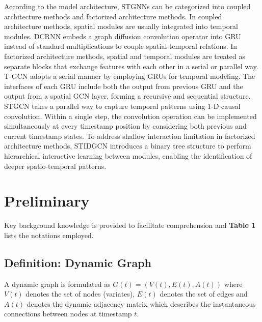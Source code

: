\documentclass[final,12pt]{elsarticle}
\begin{document}
According to the model architecture, 
STGNNs can be categorized into 
coupled architecture methods and factorized architecture methods.  %
In coupled architecture methods, 
spatial modules are usually integrated into temporal modules.  %
DCRNN \cite{li2017diffusion} 
embeds a graph diffusion convolution operator 
into GRU instead of standard multiplications 
to couple spatial-temporal relations.  %
In factorized architecture methods, 
spatial and temporal modules are treated as separate blocks 
that exchange features with each other in a serial or parallel way.  %
T-GCN \cite{zhao2019t} adopts a serial manner by employing GRUs for temporal modeling.
The interfaces of each GRU include 
both the output from previous GRU 
and the output from a spatial GCN layer, 
forming a recursive and sequential structure.  %
STGCN \cite{yu2017spatio} takes a parallel way to capture temporal patterns 
using 1-D causal convolution.
Within a single step, the convolution operation can be implemented 
simultaneously at every timestamp position 
by considering both previous and current timestamp states.  %
To address shallow interaction limitation in factorized architecture methods, 
STIDGCN \cite{liu2024spatial} introduces a binary tree structure 
to perform hierarchical interactive learning between modules, 
enabling the identification of deeper spatio-temporal patterns.  %


\section{Preliminary}
\label{sec-3}


Key background knowledge is provided to facilitate comprehension 
and \textbf{Table 1} lists the notations employed.  %


\subsection{Definition: Dynamic Graph}
\label{subsec-3.1}


A dynamic graph is formulated as $G(t) = (V(t), E(t), A(t))$ 
where $V(t)$ denotes the set of nodes (variates), 
$E(t)$ denotes the set of edges and $A(t)$ denotes the dynamic adjacency matrix 
which describes the instantaneous connections between nodes at timestamp $t$.  %
\end{document}
